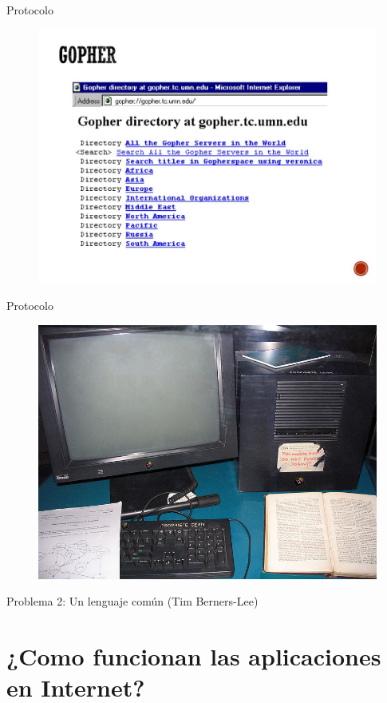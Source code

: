 \documentclass[aspectratio=169]{beamer}
\begin{document}
\begin{frame}{Protocolo}
	\begin{figure}
		\centering
		\includegraphics[width=0.7\linewidth]{Images/gopher.jpg}
	\end{figure}
\end{frame}



\begin{frame}{Protocolo}
	\begin{figure}
		\centering
		\includegraphics[width=0.5\linewidth]{Images/primer servidor web.jpg}
	\end{figure}
	
	Problema 2: Un lenguaje común (Tim Berners-Lee)
\end{frame}




{
	\section{¿Como funcionan las aplicaciones en Internet?}
}
\end{document}
